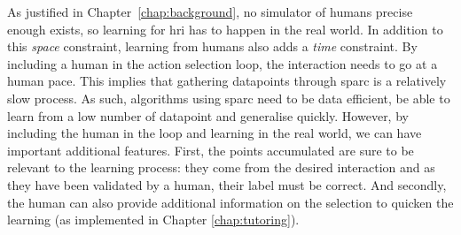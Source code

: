 As justified in Chapter~\ref{chap:background}, no simulator of humans precise enough exists, so learning for \gls{hri} has to happen in the real world. In addition to this \emph{space} constraint, learning from humans also adds a \emph{time} constraint. By including a human in the action selection loop, the interaction needs to go at a human pace. This implies that gathering datapoints through \gls{sparc} is a relatively slow process. As such, algorithms using \gls{sparc} need to be data efficient, be able to learn from a low number of datapoint and generalise quickly. However, by including the human in the loop and learning in the real world, we can have important additional features. First, the points accumulated are sure to be relevant to the learning process: they come from the desired interaction and as they have been validated by a human, their label must be correct. And secondly, the human can also provide additional information on the selection to quicken the learning (as implemented in Chapter \ref{chap:tutoring}).

